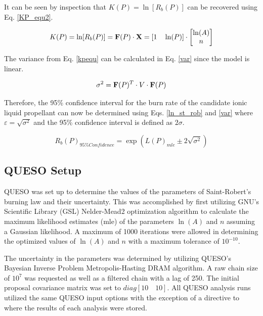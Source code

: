 \documentclass{article}
\begin{document}
It can be seen by inspection that $K(P) = \ln[R_b(P)]$ can be recovered using Eq. \ref{KP_equ2}.

\begin{equation} \label{KP_equ2}
K(P) = \ln[R_b(P)] = \mathbf{F}(P) \cdot \mathbf{X} = [1 \quad \ln(P)] \cdot 
\begin{bmatrix}
\ln(A) \\ 
n
\end{bmatrix}
\end{equation}

The variance from Eq. \ref{kpequ} can be calculated in Eq. \ref{var} since the model is linear.

\begin{equation} \label{var}
\sigma^2 = \mathbf{F}(P)^T \cdot V \cdot \mathbf{F}(P)
\end{equation}

Therefore, the 95\% confidence interval for the burn rate of the candidate ionic liquid propellant can now be determined
using Eqs. \ref{ln_st_rob} and \ref{var} where $\varepsilon = \sqrt{\sigma^2}$ and the 95\% confidence interval is 
defined as $2\sigma$.

\begin{equation} \label{Rb95}
R_b(P)_{95\% Confidence} = \exp{(L(P)_{mle} \pm 2 \sqrt{\sigma^2})}
\end{equation}

\subsection{QUESO Setup} \label{QUESO_setup}

QUESO was set up to determine the values of the parameters of Saint-Robert's burning law and their uncertainty.
This was accomplished by first utilizing GNU's Scientific Library (GSL) Nelder-Mead2 optimization algorithm to 
calculate the maximum likelihood estimates (mle) of the parameters $\ln(A)$ and $n$ assuming a Gaussian likelihood. 
A maximum of 1000 iterations were allowed in determining the optimized values of $\ln(A)$ and $n$ with a maximum 
tolerance of $10^{-10}$. 

The uncertainty in the parameters was determined by utilizing QUESO's Bayesian Inverse Problem Metropolis-Hasting 
DRAM algorithm. A raw chain size of $10^7$ was requested as well as a filtered chain with a lag of 250. The initial 
proposal covariance matrix was set to $diag[10 \quad 10]$. All QUESO analysis runs utilized the same QUESO input 
options with the exception of a directive to where the results of each analysis were stored.
\end{document}
